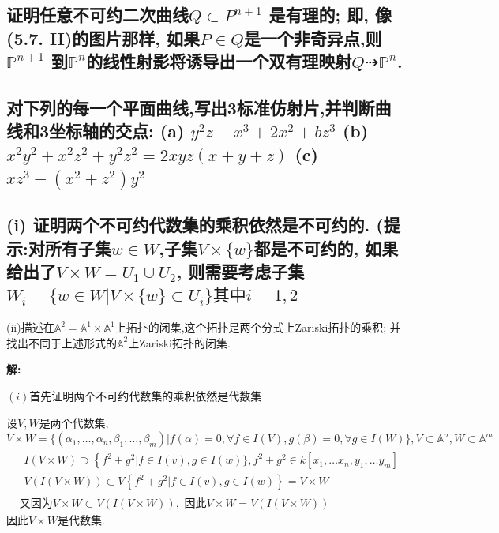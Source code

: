 \documentclass[UTF8]{book}
\begin{document}
		\subsection{证明任意不可约二次曲线$Q \subset P ^{n+1}$ 是有理的; 即, 像(5.7. II)的图片那样, 如果$P\in Q$是一个非奇异点,则 $\mathbb{P} ^{n+1}$ 到$\mathbb{P} ^{n}$的线性射影将诱导出一个双有理映射$Q \dashrightarrow \mathbb{P} ^{n}$. }
%			
%			
		\subsection{对下列的每一个平面曲线,写出3标准仿射片,并判断曲线和3坐标轴的交点:
			(a) $y^{2} z-x^{3}+2 x^{2}+b z^{3}$
			(b) $x^{2} y^{2}+x^{2} z^{2}+y^{2} z^{2}=2 x y z(x+y+z)$
			(c) $x z^{3}-\left(x^{2}+z^{2}\right) y^{2}$}
%			
%			
		\subsection{ (i) 证明两个不可约代数集的乘积依然是不可约的. (提示:对所有子集$w \in W$,子集$V \times\{w\}$都是不可约的, 如果给出了$V \times W = U _{1} \cup U _{2}$, 则需要考虑子集$ W _{ i }=\{ w \in W | V \times\{ w \} \subset U _{ i }\} \text{其中} i =1,2$}
			
				
			(ii)描述在$\mathbb{A}^{2}=\mathbb{A}^{1} \times \mathbb{A}^{1}$上拓扑的闭集,这个拓扑是两个分式上Zariski拓扑的乘积; 并找出不同于上述形式的$\mathbb{A}^{2}$上Zariski拓扑的闭集.
			
		\textbf{解:}
		
		$ (i) $首先证明两个不可约代数集的乘积依然是代数集
		
		设$ V,W $是两个代数集,$ V \times W = \{(\alpha_{1},\ldots,\alpha_{n},\beta_{1},\ldots,\beta_{m}) | f(\alpha) = 0, \forall f \in I(V),g(\beta) = 0 ,\forall g \in I(W) \}, V \subset \mathbb{A}^{n},W \subset \mathbb{A}^{m}$
		\begin{equation*}\begin{aligned}
		&\begin{array}{l}
		I(V \times W)\supset \left\{f^{2}+g^{2}|f\in I( v), g \in I(w)\}, f^{2}+g^{2} \in k\left[x_{1}, \dots x_{n}, y_{1}, \dots y_{m}\right]\right. \\
		V(I(V \times W)) \subset V\left\{f^{2}+g^{2} | f \in I(v), g \in I(w)\right\}=V \times W
		\end{array}\\
		&\text{又因为} V \times W \subset V(I(V \times W)),\text { 因此} V \times W=V(I(V \times W))
		\end{aligned}\end{equation*}
		因此$ V \times W $是代数集.
		
\end{document}
